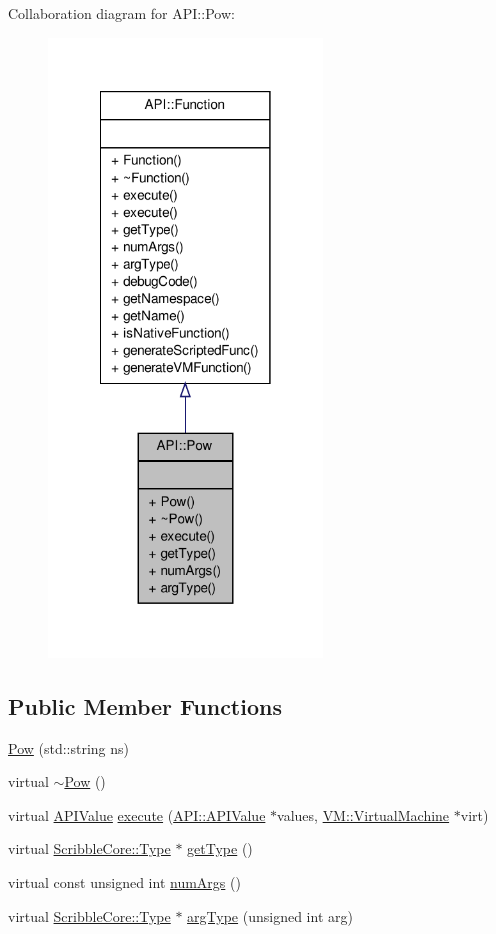 Collaboration diagram for A\-P\-I\-:\-:Pow\-:
\nopagebreak
\begin{figure}[H]
\begin{center}
\leavevmode
\includegraphics[width=206pt]{class_a_p_i_1_1_pow__coll__graph}
\end{center}
\end{figure}
\subsection*{Public Member Functions}
\begin{DoxyCompactItemize}
\item 
\hyperlink{class_a_p_i_1_1_pow_a743d37c5499551a2a4c46dda206899b7}{Pow} (std\-::string ns)
\item 
virtual \hyperlink{class_a_p_i_1_1_pow_aa4305c6cbecf5498b9960641b52bc769}{$\sim$\-Pow} ()
\item 
virtual \hyperlink{class_a_p_i_1_1_a_p_i_value}{A\-P\-I\-Value} \hyperlink{class_a_p_i_1_1_pow_a4df12d91441169908b75f53e62469ec8}{execute} (\hyperlink{class_a_p_i_1_1_a_p_i_value}{A\-P\-I\-::\-A\-P\-I\-Value} $\ast$values, \hyperlink{class_v_m_1_1_virtual_machine}{V\-M\-::\-Virtual\-Machine} $\ast$virt)
\item 
virtual \hyperlink{class_scribble_core_1_1_type}{Scribble\-Core\-::\-Type} $\ast$ \hyperlink{class_a_p_i_1_1_pow_a4897a7e224c6a356baffb12eb4e81f69}{get\-Type} ()
\item 
virtual const unsigned int \hyperlink{class_a_p_i_1_1_pow_a3b9d3e5141ceffd5adffe410d2e0f3ee}{num\-Args} ()
\item 
virtual \hyperlink{class_scribble_core_1_1_type}{Scribble\-Core\-::\-Type} $\ast$ \hyperlink{class_a_p_i_1_1_pow_a1df1febc03d78304eeb78b55ce1fbf88}{arg\-Type} (unsigned int arg)
\end{DoxyCompactItemize}
